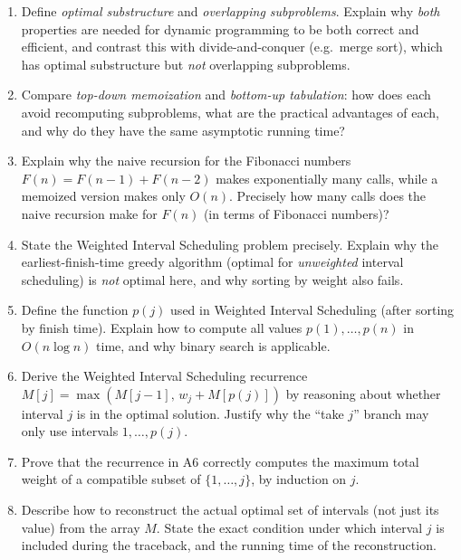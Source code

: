 \documentclass[11pt]{article}
\begin{document}
\begin{enumerate}[label=\textbf{A\arabic*.}, leftmargin=2.2em]

\item Define \emph{optimal substructure} and \emph{overlapping subproblems}. Explain why
\emph{both} properties are needed for dynamic programming to be both correct and efficient,
and contrast this with divide-and-conquer (e.g.\ merge sort), which has optimal
substructure but \emph{not} overlapping subproblems.

\item Compare \emph{top-down memoization} and \emph{bottom-up tabulation}: how does each
avoid recomputing subproblems, what are the practical advantages of each, and why do they
have the same asymptotic running time?

\item Explain why the naive recursion for the Fibonacci numbers $F(n) = F(n-1) + F(n-2)$
makes exponentially many calls, while a memoized version makes only $O(n)$. Precisely how
many calls does the naive recursion make for $F(n)$ (in terms of Fibonacci numbers)?

\item State the Weighted Interval Scheduling problem precisely. Explain why the
earliest-finish-time greedy algorithm (optimal for \emph{unweighted} interval scheduling)
is \emph{not} optimal here, and why sorting by weight also fails.

\item Define the function $p(j)$ used in Weighted Interval Scheduling (after sorting by
finish time). Explain how to compute all values $p(1), \ldots, p(n)$ in $O(n \log n)$ time,
and why binary search is applicable.

\item Derive the Weighted Interval Scheduling recurrence $M[j] = \max(M[j-1],\, w_j +
M[p(j)])$ by reasoning about whether interval $j$ is in the optimal solution. Justify why
the ``take $j$'' branch may only use intervals $1, \ldots, p(j)$.

\item Prove that the recurrence in A6 correctly computes the maximum total weight of a
compatible subset of $\{1, \ldots, j\}$, by induction on $j$.

\item Describe how to reconstruct the actual optimal set of intervals (not just its value)
from the array $M$. State the exact condition under which interval $j$ is included during
the traceback, and the running time of the reconstruction.


\end{enumerate}
\end{document}
